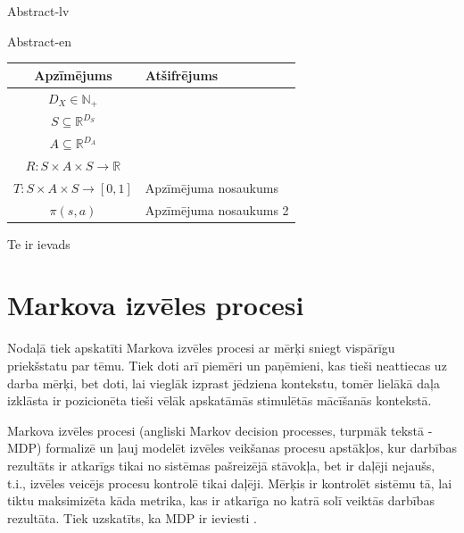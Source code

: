 \documentclass{ludis} %
\begin{document}
\maketitle

\begin{abstract-lv}
Abstract-lv
\end{abstract-lv}
\clearpage

\begin{abstract-en}
Abstract-en
\end{abstract-en}


\tableofcontents

\setlength\LTleft{0pt}
\setlength\LTright{0pt}
\begin{longtable}{| c | p{28em} |}
  \hline
  \textbf{Apzīmējums} & \textbf{Atšifrējums}\\ 
  \endhead

  \hline
  $D_X \in \mathbb{N}_+$ & \\ %
  $S \subseteq \mathbb{R}^{D_S}$ & \\
  $A \subseteq \mathbb{R}^{D_A}$ & \\
  $R:S \times A \times S \rightarrow \mathbb{R}$ & \\
  $T:S \times A \times S \rightarrow [0,1]$ & Apzīmējuma nosaukums \\
  $\pi(s, a)$ &  Apzīmējuma nosaukums 2\\
  \hline
\end{longtable}

Te ir ievads
\chapter{Markova izvēles procesi} \label{chap:mdp}
Nodaļā tiek apskatīti Markova izvēles procesi ar mērķi sniegt vispārīgu priekšstatu par tēmu.
Tiek doti arī piemēri un paņēmieni, kas tieši neattiecas uz darba mērķi, bet doti, lai vieglāk izprast jēdziena kontekstu, tomēr lielākā daļa izklāsta ir pozicionēta tieši vēlāk apskatāmās stimulētās mācīšanās kontekstā.

Markova izvēles procesi (angliski Markov decision processes, turpmāk tekstā - MDP) formalizē un ļauj modelēt izvēles veikšanas procesu apstākļos, kur darbības rezultāts ir atkarīgs tikai no sistēmas pašreizējā stāvokļa, bet ir daļēji nejaušs, t.i., izvēles veicējs procesu kontrolē tikai daļēji.
Mērķis ir kontrolēt sistēmu tā, lai tiktu maksimizēta kāda metrika, kas ir atkarīga no katrā solī veiktās darbības rezultāta.
Tiek uzskatīts, ka MDP ir ieviesti \autocite{Bel}.
\end{document}
